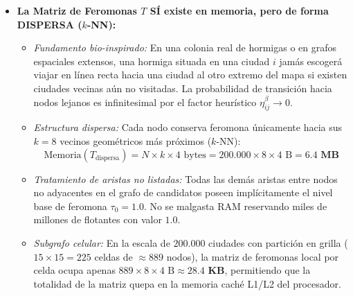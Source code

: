 \documentclass[11pt,a4paper]{article}
\begin{document}
\begin{itemize}
    \item \textbf{La Matriz de Feromonas $T$ SÍ existe en memoria, pero de forma DISPERSA ($k$-NN):}
    \begin{itemize}
        \item \emph{Fundamento bio-inspirado:} En una colonia real de hormigas o en grafos espaciales extensos, una hormiga situada en una ciudad $i$ jamás escogerá viajar en línea recta hacia una ciudad al otro extremo del mapa si existen ciudades vecinas aún no visitadas. La probabilidad de transición hacia nodos lejanos es infinitesimal por el factor heurístico $\eta_{ij}^\beta \to 0$.
        \item \emph{Estructura dispersa:} Cada nodo conserva feromona únicamente hacia sus $k=8$ vecinos geométricos más próximos ($k$-NN):
        \begin{equation}
            \text{Memoria}(T_{\text{dispersa}}) = N \times k \times 4\text{ bytes} = 200.000 \times 8 \times 4\text{ B} = \mathbf{6.4\text{ MB}}
        \end{equation}
        \item \emph{Tratamiento de aristas no listadas:} Todas las demás aristas entre nodos no adyacentes en el grafo de candidatos poseen implícitamente el nivel base de feromona $\tau_0 = 1.0$. No se malgasta RAM reservando miles de millones de flotantes con valor $1.0$.
        \item \emph{Subgrafo celular:} En la escala de $200.000$ ciudades con partición en grilla ($15 \times 15 = 225$ celdas de $\approx 889$ nodos), la matriz de feromonas local por celda ocupa apenas $889 \times 8 \times 4\text{ B} \approx \mathbf{28.4\text{ KB}}$, permitiendo que la totalidad de la matriz quepa en la memoria caché L1/L2 del procesador.
    \end{itemize}
\end{itemize}
\end{document}
